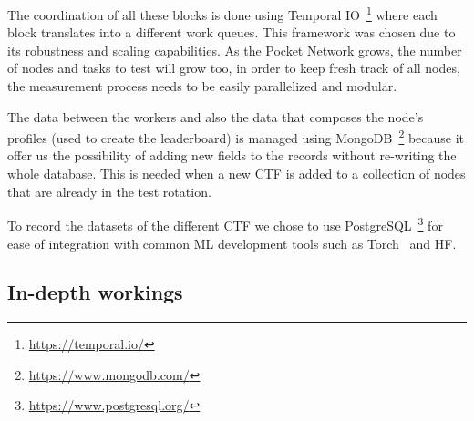 The coordination of all these blocks is done using Temporal IO~\footnote{\url{https://temporal.io/}} where each block translates into a different work queues. This framework was chosen due to its robustness and scaling capabilities. As the Pocket Network grows, the number of nodes and tasks to test will grow too, in order to keep fresh track of all nodes, the measurement process needs to be easily parallelized and modular.

The data between the workers and also the data that composes the node's profiles (used to create the leaderboard) is managed using MongoDB~\footnote{\url{https://www.mongodb.com/}} because it offer us the possibility of adding new fields to the records without re-writing the whole database. This is needed when a new \gls{CTF} is added to a collection of nodes that are already in the test rotation.

To record the datasets of the different \gls{CTF} we chose to use PostgreSQL~\footnote{\url{https://www.postgresql.org/}} for ease of integration with common \gls{ML} development tools such as Torch~\cite{paszke2017automatic} and \gls{HF}.

\subsection{In-depth workings}

